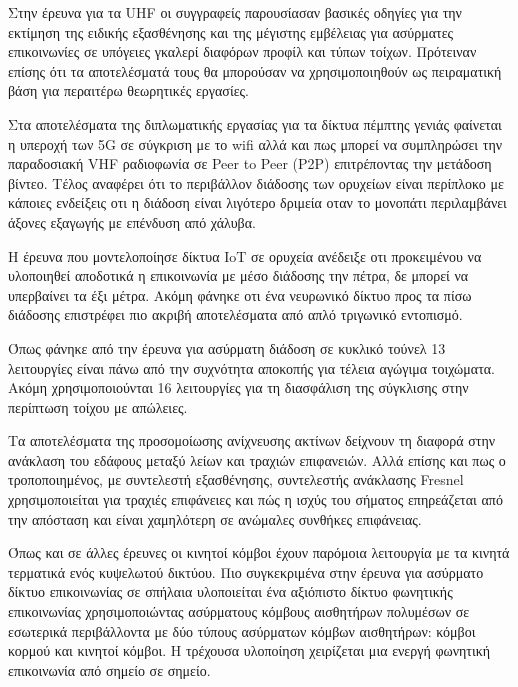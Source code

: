 \documentclass[12pt, greek]{article}
\begin{document}
\begin{multicols*}{2}
        Στην έρευνα για τα UHF \cite{rak_uhf_2007} οι συγγραφείς παρουσίασαν βασικές οδηγίες
        για την εκτίμηση της ειδικής εξασθένησης και της μέγιστης εμβέλειας για ασύρματες
        επικοινωνίες σε υπόγειες γκαλερί διαφόρων προφίλ και τύπων τοίχων. Πρότειναν επίσης 
        ότι τα αποτελέσματά τους θα μπορούσαν να χρησιμοποιηθούν ως πειραματική βάση για 
        περαιτέρω θεωρητικές εργασίες.

        Στα αποτελέσματα της διπλωματικής εργασίας για τα δίκτυα πέμπτης γενιάς \cite{branch_fifth_2021}
        φαίνεται η υπεροχή των 5G σε σύγκριση με το wifi αλλά και πως μπορεί να συμπληρώσει
        την παραδοσιακή VHF ραδιοφωνία σε Peer to Peer (P2P) επιτρέποντας την μετάδοση βίντεο.
        Τέλος αναφέρει ότι το περιβάλλον διάδοσης των ορυχείων είναι περίπλοκο με κάποιες ενδείξεις
        οτι η διάδοση είναι λιγότερο δριμεία οταν το μονοπάτι περιλαμβάνει άξονες εξαγωγής με
        επένδυση από χάλυβα.

        Η έρευνα που μοντελοποίησε δίκτυα IoT σε ορυχεία \cite{ming_study_2019} ανέδειξε οτι 
        προκειμένου να υλοποιηθεί αποδοτικά η επικοινωνία με μέσο διάδοσης την πέτρα, δε μπορεί
        να υπερβαίνει τα έξι μέτρα. Ακόμη φάνηκε οτι ένα νευρωνικό δίκτυο προς τα πίσω διάδοσης
        επιστρέφει πιο ακριβή αποτελέσματα από απλό τριγωνικό εντοπισμό.

        Όπως φάνηκε από την έρευνα για ασύρματη διάδοση σε κυκλικό τούνελ \cite{dudley_wireless_2005}
        13 λειτουργίες είναι πάνω από την συχνότητα αποκοπής για τέλεια αγώγιμα τοιχώματα. Ακόμη
        χρησιμοποιούνται 16 λειτουργίες για τη διασφάλιση της σύγκλισης στην περίπτωση τοίχου 
        με απώλειες.

        Τα αποτελέσματα της προσομοίωσης ανίχνευσης ακτίνων \cite{soo_investigation_2018} δείχνουν
        τη διαφορά στην ανάκλαση του εδάφους μεταξύ λείων και τραχιών επιφανειών. Αλλά επίσης και
        πως ο τροποποιημένος, με συντελεστή εξασθένησης, συντελεστής ανάκλασης Fresnel χρησιμοποιείται
        για τραχιές επιφάνειες και πώς η ισχύς του σήματος επηρεάζεται από την απόσταση και είναι 
        χαμηλότερη σε ανώμαλες συνθήκες επιφάνειας.

        Όπως και σε άλλες έρευνες οι κινητοί κόμβοι έχουν παρόμοια λειτουργία με τα κινητά τερματικά
        ενός κυψελωτού δικτύου. Πιο συγκεκριμένα στην έρευνα για ασύρματο δίκτυο επικοινωνίας σε
        σπήλαια \cite{yavuz_-cave_2009} υλοποιείται ένα αξιόπιστο δίκτυο φωνητικής επικοινωνίας
        χρησιμοποιώντας ασύρματους κόμβους αισθητήρων πολυμέσων σε εσωτερικά περιβάλλοντα με δύο
        τύπους ασύρματων κόμβων αισθητήρων: κόμβοι κορμού και κινητοί κόμβοι. Η τρέχουσα υλοποίηση
        χειρίζεται μια ενεργή φωνητική επικοινωνία από σημείο σε σημείο.


\end{multicols*}
\end{document}
